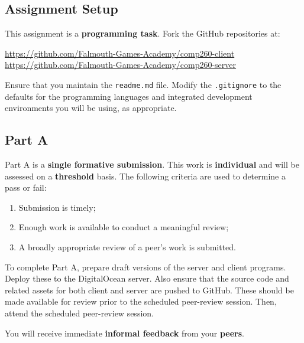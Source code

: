 \documentclass{../../fal_assignment}
\begin{document}
\subsection*{Assignment Setup}

This assignment is a \textbf{programming task}. Fork the GitHub repositories at:

\url{https://github.com/Falmouth-Games-Academy/comp260-client} \\
\url{https://github.com/Falmouth-Games-Academy/comp260-server}

Ensure that you maintain the \texttt{readme.md} file. Modify the \texttt{.gitignore} to the defaults for the programming languages and integrated development environments you will be using, as appropriate.

\subsection*{Part A}

Part A is a \textbf{single formative submission}. This work is \textbf{individual} and will be assessed on a \textbf{threshold} basis. The following criteria are used to determine a pass or fail:

\begin{enumerate}[label=(\alph*)]
	\item Submission is timely;
	\item Enough work is available to conduct a meaningful review;
	\item A broadly appropriate review of a peer's work is submitted.
\end{enumerate}

To complete Part A, prepare draft versions of the server and client programs. Deploy these to the DigitalOcean server. Also ensure that the source code and related assets for both client and server are pushed to GitHub. These should be made available for review prior to the scheduled peer-review session. Then, attend the scheduled peer-review session.


You will receive immediate \textbf{informal feedback} from your \textbf{peers}.
\end{document}
